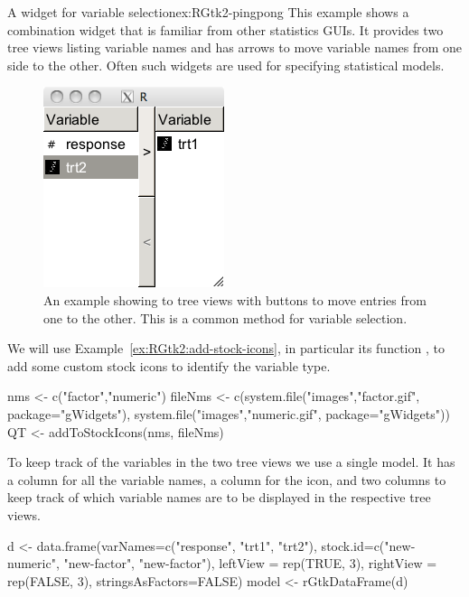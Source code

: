 \begin{example}{A widget for variable selection}{ex:RGtk2-pingpong}
This example shows a combination widget that is familiar from other
statistics GUIs. It provides two tree views listing variable names and
has arrows to move variable names from one side to the other. Often
such widgets are used for specifying statistical models. 

\begin{figure}
  \centering
  \includegraphics[width=.4\textwidth]{ex-RGtk2-pingpong}
  \caption{An example showing to tree views with buttons to move entries from one to the other. This is a common method for variable selection.}
  \label{fig:RGtk2-pingpong}
\end{figure}


We will use Example~\ref{ex:RGtk2:add-stock-icons}, in particular its
function , to add some custom
stock icons to identify the variable type.
\begin{Schunk}
\begin{Sinput}
 nms <- c("factor","numeric")
 fileNms <- c(system.file("images","factor.gif", package="gWidgets"),
              system.file("images","numeric.gif", package="gWidgets"))
 QT <- addToStockIcons(nms, fileNms)
\end{Sinput}
\end{Schunk}

To keep track of the variables in the two tree views we use a single
model. It has a column for all the variable names, a column for the
icon, and two columns to keep track of which variable names are to be
displayed in the respective tree views.
\begin{Schunk}
\begin{Sinput}
 d <- data.frame(varNames=c("response", "trt1", "trt2"),
                 stock.id=c("new-numeric", "new-factor", "new-factor"),
                 leftView  = rep(TRUE, 3),
                 rightView = rep(FALSE, 3),
                 stringsAsFactors=FALSE)
 model <- rGtkDataFrame(d)
\end{Sinput}
\end{Schunk}


\end{example}
